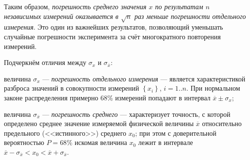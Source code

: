 Таким образом, \emph{погрешность среднего значения $x$ по результатам
$n$ независимых измерений оказывается в $\sqrt{n}$ раз меньше погрешности
отдельного измерения}. Это один из важнейших результатов, позволяющий
уменьшать случайные погрешности эксперимента за счёт многократного
повторения измерений.

Подчеркнём отличия между $\sigma_{x}$ и $\sigma_{\overline{x}}$:

величина $\sigma_{x}$ --- \emph{погрешность отдельного
измерения} --- является характеристикой разброса значений
в совокупности измерений $\left\{ x_{i}\right\} $, $i=1..n$. При
нормальном законе распределения примерно 68\% измерений попадают в
интервал $\overline{x}\pm\sigma_{x}$;

величина $\sigma_{\overline{x}}$ --- \emph{погрешность
среднего} --- характеризует точность, с которой определено
среднее значение измеряемой физической величины $\overline{x}$ относительно
предельного (<<истинного>>) среднего $x_{0}$;
при этом с доверительной вероятностью $P=68\%$ искомая величина $x_{0}$
лежит в интервале $\overline{x}-\sigma_{\overline{x}}<x_{0}<\overline{x}+\sigma_{\overline{x}}$.




